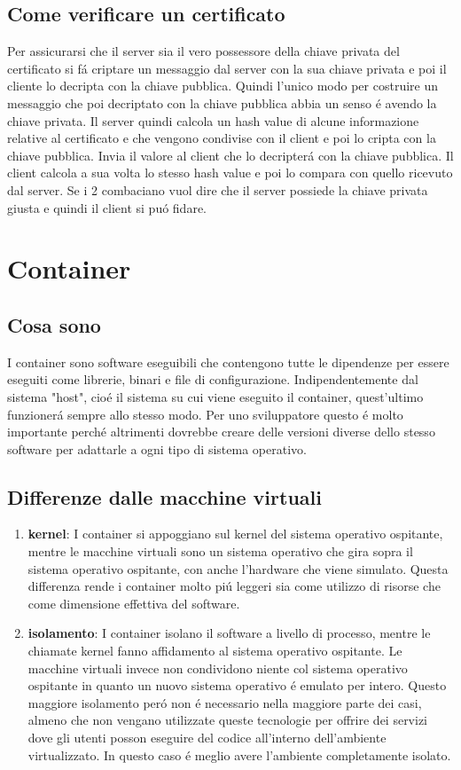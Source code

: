 \subsection{Come verificare un certificato}
Per assicurarsi che il server sia il vero possessore della chiave privata del certificato si fá criptare un messaggio dal server con la sua chiave privata e poi il cliente lo decripta con la chiave pubblica. Quindi l'unico modo per costruire un messaggio che poi decriptato con la chiave pubblica abbia un senso é avendo la chiave privata. Il server quindi calcola un hash value di alcune informazione relative al certificato e che vengono condivise con il client e poi lo cripta con la chiave pubblica. Invia il valore al client che lo decripterá con la chiave pubblica. Il client calcola a sua volta lo stesso hash value e poi lo compara con quello ricevuto dal server. Se i 2 combaciano vuol dire che il server possiede la chiave privata giusta e quindi il client si puó fidare.

\section{Container}
\subsection{Cosa sono}
\cite{container}I container sono software eseguibili che contengono tutte le dipendenze per essere eseguiti come librerie, binari e file di configurazione. Indipendentemente dal sistema "host", cioé il sistema su cui viene eseguito il container, quest'ultimo funzionerá sempre allo stesso modo. Per uno sviluppatore questo é molto importante perché altrimenti dovrebbe creare delle versioni diverse dello stesso software per adattarle a ogni tipo di sistema operativo.
\subsection{Differenze dalle macchine virtuali}
\begin{enumerate}
  \item \textbf{kernel}: I container si appoggiano sul kernel del sistema operativo ospitante, mentre le macchine virtuali sono un sistema operativo che gira sopra il sistema operativo ospitante, con anche l'hardware che viene simulato. Questa differenza rende i container molto piú leggeri sia come utilizzo di risorse che come dimensione effettiva del software.
  \item \textbf{isolamento}: I container isolano il software a livello di processo, mentre le chiamate kernel fanno affidamento al sistema operativo ospitante. Le macchine virtuali invece non condividono niente col sistema operativo ospitante in quanto un nuovo sistema operativo é emulato per intero. Questo maggiore isolamento peró non é necessario nella maggiore parte dei casi, almeno che non vengano utilizzate queste tecnologie per offrire dei servizi dove gli utenti posson eseguire del codice all'interno dell'ambiente virtualizzato. In questo caso é meglio avere l'ambiente completamente isolato.
\end{enumerate}


